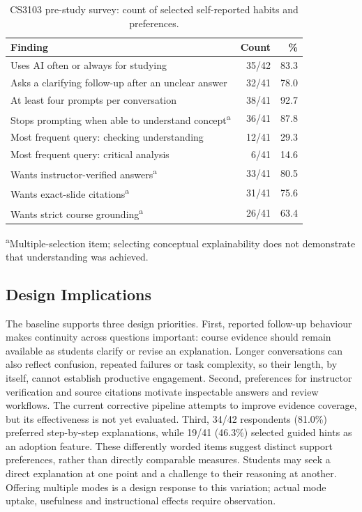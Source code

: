\documentclass[conference]{IEEEtran}
\begin{document}
\begin{table}[t]
\centering
\caption{CS3103 pre-study survey: count of selected self-reported habits and preferences.}
\label{tab:cs3103baseline}
\footnotesize
\setlength{\tabcolsep}{3pt}
\begin{tabular}{@{}p{5.1cm}rr@{}}
\toprule
Finding & Count & \% \\
\midrule
Uses AI often or always for studying & 35/42 & 83.3 \\
Asks a clarifying follow-up after an unclear answer & 32/41 & 78.0 \\
At least four prompts per conversation & 38/41 & 92.7 \\
Stops prompting when able to understand concept\textsuperscript{a} & 36/41 & 87.8 \\
Most frequent query: checking understanding & 12/41 & 29.3 \\
Most frequent query: critical analysis & 6/41 & 14.6 \\
Wants instructor-verified answers\textsuperscript{a} & 33/41 & 80.5 \\
Wants exact-slide citations\textsuperscript{a} & 31/41 & 75.6 \\
Wants strict course grounding\textsuperscript{a} & 26/41 & 63.4 \\
\bottomrule
\end{tabular}
\par\smallskip
\parbox{\columnwidth}{\footnotesize\textsuperscript{a}Multiple-selection item; selecting conceptual explainability does not demonstrate that understanding was achieved.}
\end{table}

\subsection{Design Implications}
The baseline supports three design priorities. First, reported follow-up behaviour makes continuity across questions important: course evidence should remain available as students clarify or revise an explanation. Longer conversations can also reflect confusion, repeated failures or task complexity, so their length, by itself, cannot establish productive engagement.
Second, preferences for instructor verification and source citations motivate inspectable answers and review workflows. The current corrective pipeline attempts to improve evidence coverage, but its effectiveness is not yet evaluated.
Third, 34/42 respondents (81.0\%) preferred step-by-step explanations, while 19/41 (46.3\%) selected guided hints as an adoption feature. These differently worded items suggest distinct support preferences, rather than directly comparable measures. Students may seek a direct explanation at one point and a challenge to their reasoning at another. Offering multiple modes is a design response to this variation; actual mode uptake, usefulness and instructional effects require observation.
\end{document}
